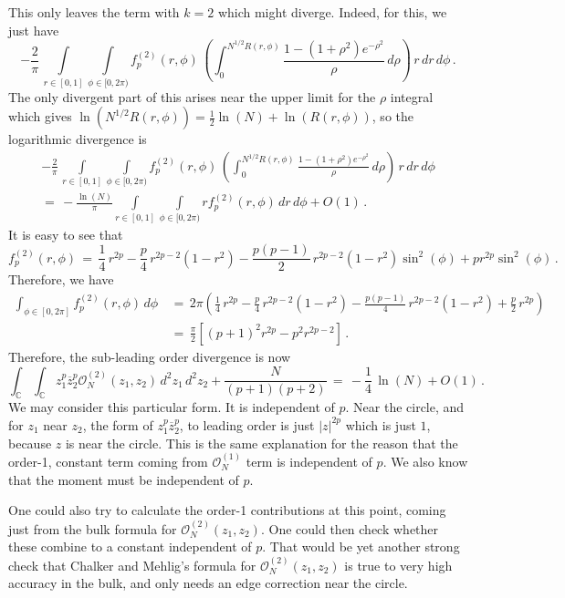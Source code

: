 \documentclass[12pt]{report}
\newcommand{\C}{\mathbb{C}}
\newcommand{\be}{\begin{equation}}
\newcommand{\ee}{\end{equation}}
\theoremstyle{definition}
\begin{document}
This only leaves the term with $k=2$ which might diverge.
Indeed, for this, we just have
$$
-\frac{2}{\pi}\,
\int\limits_{r \in [0,1]} \int\limits_{\phi \in [0,2\pi)} f_p^{(2)}(r,\phi)\,\left(\int_0^{N^{1/2}R(r,\phi)}  \frac{1-(1+\rho^2)e^{-\rho^2}}{\rho}\, d\rho\right)\, r\, dr\, d\phi\, .
$$
The only divergent part of this arises near the upper limit for the $\rho$ integral which gives $\ln(N^{1/2} R(r,\phi)) = \frac{1}{2} \ln(N) + \ln(R(r,\phi))$,
so the logarithmic divergence is 
\begin{multline}
-\frac{2}{\pi}\,
\int\limits_{r \in [0,1]} \int\limits_{\phi \in [0,2\pi)} f_p^{(2)}(r,\phi)\,\left(\int_0^{N^{1/2}R(r,\phi)}  \frac{1-(1+\rho^2)e^{-\rho^2}}{\rho}\, d\rho\right)\, r\, dr\, d\phi\\
=\,
-\frac{\ln(N)}{\pi} \int\limits_{r \in [0,1]} \int\limits_{\phi \in [0,2\pi)} r f_p^{(2)}(r,\phi)\, dr\, d\phi
+ O(1)\, .
\end{multline}
It is easy to see that
\be
f_p^{(2)}(r,\phi)\, =\,
\frac{1}{4}\, r^{2p} - \frac{p}{4}\, r^{2p-2} (1-r^2) - \frac{p(p-1)}{2}\, r^{2p-2}(1-r^2) \sin^2(\phi) + p r^{2p}\sin^2(\phi)\, .
\ee
Therefore, we have
\be
\begin{split}
\int_{\phi \in [0,2\pi]} f_p^{(2)}(r,\phi)\, d\phi\, 
&=\, 2\pi
\left(\frac{1}{4}\, r^{2p} - \frac{p}{4}\, r^{2p-2} (1-r^2) - \frac{p(p-1)}{4}\, r^{2p-2}(1-r^2) + \frac{p}{2}\, r^{2p}\right)\\
&=\, \frac{\pi}{2} \left[(p+1)^2 r^{2p} - p^2 r^{2p-2}\right]\, .
\end{split}
\ee
Therefore, the sub-leading order divergence is now
\be
\label{eq:sL}
\int_{\C} \int_{\C} z_1^p \overline{z}_2^p \mathcal{O}_N^{(2)}(z_1,z_2)\, d^2z_1\, d^2z_2
+ \frac{N}{(p+1)(p+2)}\,
=\, -\frac{1}{4}\, \ln(N) + O(1)\, .
\ee
We may consider this particular form.
It is independent of $p$.
Near the circle, and for $z_1$ near $z_2$, the form of $z_1^p \overline{z}_2^p$, to leading order is just $|z|^{2p}$ which is just $1$, because $z$ is near the circle.
This is the same explanation for the reason that the order-1, constant term coming from $\mathcal{O}_N^{(1)}$ term is independent of $p$.
We also know that the moment must be independent of $p$.

One could also try to calculate the order-1 contributions at this point, coming just from
the bulk formula for $\mathcal{O}_N^{(2)}(z_1,z_2)$.
One could then check whether these combine to a constant independent of $p$.
That would be yet another strong check that Chalker and Mehlig's formula for $\mathcal{O}_N^{(2)}(z_1,z_2)$  is true to very high accuracy in the bulk, and only needs an edge correction
near the circle.
\end{document}
